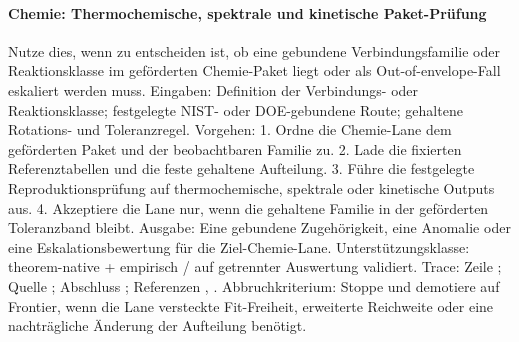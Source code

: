 \paragraph{Chemie: Thermochemische, spektrale und kinetische Paket-Prüfung}
Nutze dies, wenn zu entscheiden ist, ob eine gebundene Verbindungsfamilie oder Reaktionsklasse im geförderten Chemie-Paket liegt oder als Out-of-envelope-Fall eskaliert werden muss.
Eingaben: Definition der Verbindungs- oder Reaktionsklasse; \allowbreak festgelegte NIST- oder DOE-gebundene Route; \allowbreak gehaltene Rotations- und Toleranzregel.
Vorgehen: 1. Ordne die Chemie-Lane dem geförderten Paket und der beobachtbaren Familie zu. 2. Lade die fixierten Referenztabellen und die feste gehaltene Aufteilung. 3. Führe die festgelegte Reproduktionsprüfung auf thermochemische, spektrale oder kinetische Outputs aus. 4. Akzeptiere die Lane nur, wenn die gehaltene Familie in der geförderten Toleranzband bleibt.
Ausgabe: Eine gebundene Zugehörigkeit, eine Anomalie oder eine Eskalationsbewertung für die Ziel-Chemie-Lane.
Unterstützungsklasse: theorem-native + empirisch / auf getrennter Auswertung validiert.
Trace: Zeile ; \allowbreak Quelle ; \allowbreak Abschluss ; \allowbreak Referenzen , \allowbreak {}.
Abbruchkriterium: Stoppe und demotiere auf Frontier, wenn die Lane versteckte Fit-Freiheit, erweiterte Reichweite oder eine nachträgliche Änderung der Aufteilung benötigt.

